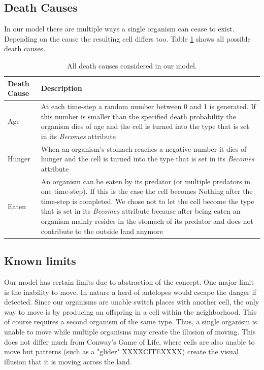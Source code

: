 \documentclass[11pt]{article}
\begin{document}
\subsection{Death Causes}
In our model there are multiple ways a single organism can cease to exist. Depending on the cause the resulting cell differs too. Table \ref{tab:deathCauses} shows all possible death causes.
\begin{table}[htbp]
\centering
\begin{tabular}{l|p{11cm}}
Death Cause & Description \\ 
\hline 
\hline 
Age & At each time-step a random number between 0 and 1 is generated. If this number is smaller than the specified death probability the organism dies of age and the cell is turned into the type that is set in its {\it Becomes} attribute\\ 
\hline 
Hunger & When an organism's stomach reaches a negative number it dies of hunger and the cell is turned into the type that is set in its {\it Becomes} attribute\\ 
\hline 
Eaten & An organism can be eaten by its predator (or multiple predators in one time-step). If this is the case the cell becomes Nothing after the time-step is completed. We chose not to let the cell become the type that is set in its {\it Becomes} attribute because after being eaten an organism mainly resides in the stomach of its predator and does not contribute to the outside land anymore\\  
\end{tabular}
\caption{All death causes considered in our model.}
\label{tab:deathCauses}
\end{table}

\subsection{Known limits}
\label{sec:knownLimits}
Our model has certain limits due to abstraction of the concept. One major limit is the inability to move. In nature a herd of antelopes would escape the danger if detected. Since our organisms are unable switch places with another cell, the only way to move is by producing an offspring in a cell within the neighborhood. This of course requires a second organism of the same type. Thus, a single organism is unable to move while multiple organisms may create the illusion of moving. This does not differ much from Conway's Game of Life, where cells are also unable to move but patterns (such as a "glider" XXXXCITEXXXX) create the visual illusion that it is moving across the land.
\end{document}
